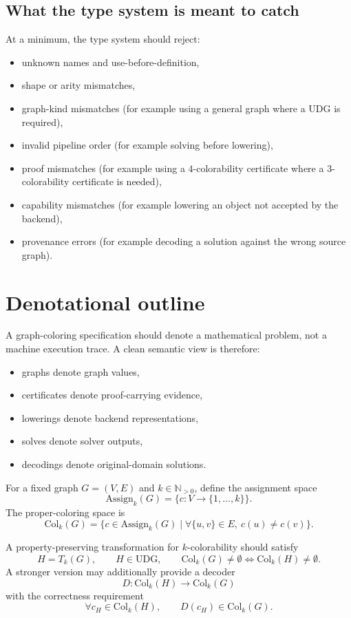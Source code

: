 \documentclass[11pt]{article}
\newcommand{\UDG}{\mathrm{UDG}}
\newcommand{\Col}{\mathrm{Col}}
\newcommand{\Nat}{\mathbb{N}}
\begin{document}
\subsection{What the type system is meant to catch}

At a minimum, the type system should reject:
\begin{itemize}
    \item unknown names and use-before-definition,
    \item shape or arity mismatches,
    \item graph-kind mismatches (for example using a general graph where a UDG is required),
    \item invalid pipeline order (for example solving before lowering),
    \item proof mismatches (for example using a $4$-colorability certificate where a $3$-colorability certificate is needed),
    \item capability mismatches (for example lowering an object not accepted by the backend),
    \item provenance errors (for example decoding a solution against the wrong source graph).
\end{itemize}

\section{Denotational outline}

A graph-coloring specification should denote a mathematical problem, not a machine execution trace. A clean semantic view is therefore:
\begin{itemize}
    \item graphs denote graph values,
    \item certificates denote proof-carrying evidence,
    \item lowerings denote backend representations,
    \item solves denote solver outputs,
    \item decodings denote original-domain solutions.
\end{itemize}

For a fixed graph $G=(V,E)$ and $k\in\Nat_{>0}$, define the assignment space
\[
\mathrm{Assign}_k(G)=\{c:V\to\{1,\dots,k\}\}.
\]
The proper-coloring space is
\[
\Col_k(G)=\bigl\{c\in \mathrm{Assign}_k(G)\mid \forall \{u,v\}\in E,\ c(u)\neq c(v)\bigr\}.
\]

A property-preserving transformation for $k$-colorability should satisfy
\[
H=T_k(G),\qquad H\in \UDG,\qquad \Col_k(G)\neq\emptyset \iff \Col_k(H)\neq\emptyset.
\]
A stronger version may additionally provide a decoder
\[
D: \Col_k(H) \to \Col_k(G)
\]
with the correctness requirement
\[
\forall c_H\in\Col_k(H),\qquad D(c_H)\in\Col_k(G).
\]
\end{document}
